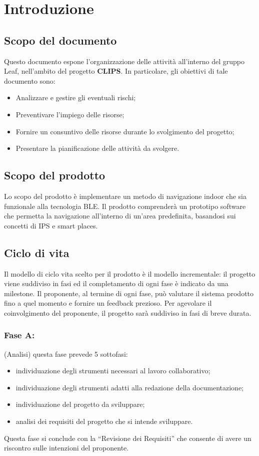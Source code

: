 \documentclass[../PianoProgetto.tex]{subfiles}
\begin{document}
\section{Introduzione}
	\subsection{Scopo del documento}
	Questo documento espone l'organizzazione delle attività all'interno del gruppo Leaf, nell'ambito del progetto \textbf{CLIPS}.
In particolare, gli obiettivi di tale documento sono:
	\begin{itemize}
	\item Analizzare e gestire gli eventuali rischi;
	\item Preventivare l'impiego delle risorse;
	\item Fornire un consuntivo delle risorse durante lo svolgimento del progetto;
	\item Presentare la pianificazione delle attività da svolgere.
	\end{itemize}
	
	\subsection{Scopo del prodotto}
	Lo scopo del prodotto è implementare un metodo di navigazione indoor che sia funzionale alla tecnologia BLE.
	Il prodotto comprenderà un prototipo software che permetta la navigazione all’interno di un’area predefinita, basandosi sui concetti di IPS e smart places.


	\subsection{Ciclo di vita}
	Il modello di ciclo vita scelto per il prodotto è il modello incrementale: il progetto viene suddiviso in fasi ed il completamento di ogni fase è indicato da una milestone.
	Il proponente, al termine di ogni fase, può valutare il sistema prodotto fino a quel momento e fornire un feedback prezioso.
	Per agevolare il coinvolgimento del proponente, il progetto sarà suddiviso in fasi di breve durata.

		\subsubsection{Fase A:}(Analisi) questa fase prevede 5 sottofasi:
		\begin{itemize}
		\item individuazione degli strumenti necessari al lavoro collaborativo;
		\item individuazione degli strumenti adatti alla redazione della documentazione;
		\item individuazione del progetto da sviluppare;
		\item analisi dei requisiti del progetto che si intende sviluppare.
		\end{itemize}
		Questa fase si conclude con la “Revisione dei Requisiti” che consente di avere un riscontro sulle intenzioni del proponente.
\end{document}
